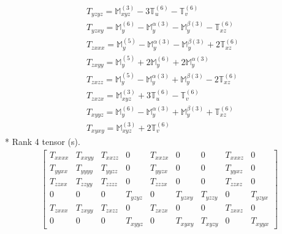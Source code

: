 \documentclass[fleqn,8pt,landscape]{jsarticle}
\begin{document}
\begin{align*}
& T_{yzyz} = \mathbb{M}_{xyz}^{(3)} - 3 \mathbb{T}_{u}^{(6)} - \mathbb{T}_{v}^{(6)} \\
& T_{yzxy} = \mathbb{M}_{y}^{(6)} - \mathbb{M}_{y}^{\alpha(3)} - \mathbb{M}_{y}^{\beta(3)} - \mathbb{T}_{xz}^{(6)} \\
& T_{zxxx} = \mathbb{M}_{y}^{(5)} - \mathbb{M}_{y}^{\alpha(3)} - \mathbb{M}_{y}^{\beta(3)} + 2 \mathbb{T}_{xz}^{(6)} \\
& T_{zxyy} = \mathbb{M}_{y}^{(5)} + 2 \mathbb{M}_{y}^{(6)} + 2 \mathbb{M}_{y}^{\alpha(3)} \\
& T_{zxzz} = \mathbb{M}_{y}^{(5)} - \mathbb{M}_{y}^{\alpha(3)} + \mathbb{M}_{y}^{\beta(3)} - 2 \mathbb{T}_{xz}^{(6)} \\
& T_{zxzx} = \mathbb{M}_{xyz}^{(3)} + 3 \mathbb{T}_{u}^{(6)} - \mathbb{T}_{v}^{(6)} \\
& T_{xyyz} = \mathbb{M}_{y}^{(6)} - \mathbb{M}_{y}^{\alpha(3)} + \mathbb{M}_{y}^{\beta(3)} + \mathbb{T}_{xz}^{(6)} \\
& T_{xyxy} = \mathbb{M}_{xyz}^{(3)} + 2 \mathbb{T}_{v}^{(6)}
\end{align*}
* Rank 4 tensor (s).
\begin{align*}
\begin{bmatrix} T_{xxxx} & T_{xxyy} & T_{xxzz} & 0 & T_{xxzx} & 0 & 0 & T_{xxxz} & 0 \\ T_{yyxx} & T_{yyyy} & T_{yyzz} & 0 & T_{yyzx} & 0 & 0 & T_{yyxz} & 0 \\ T_{zzxx} & T_{zzyy} & T_{zzzz} & 0 & T_{zzzx} & 0 & 0 & T_{zzxz} & 0 \\ 0 & 0 & 0 & T_{yzyz} & 0 & T_{yzxy} & T_{yzzy} & 0 & T_{yzyx} \\ T_{zxxx} & T_{zxyy} & T_{zxzz} & 0 & T_{zxzx} & 0 & 0 & T_{zxxz} & 0 \\ 0 & 0 & 0 & T_{xyyz} & 0 & T_{xyxy} & T_{xyzy} & 0 & T_{xyyx} \end{bmatrix}
\end{align*}
\end{document}
